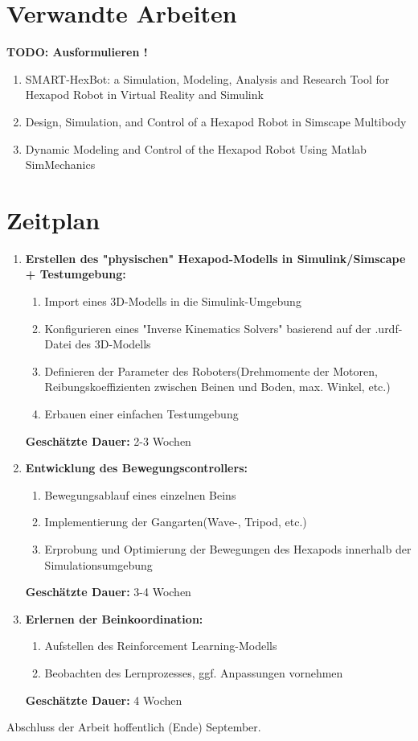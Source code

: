 \section{Verwandte Arbeiten}
\textbf{TODO: Ausformulieren !}
\begin{enumerate}

\item SMART-HexBot: a Simulation, Modeling, Analysis and
Research Tool for Hexapod Robot in Virtual Reality and
Simulink

\item Design, Simulation, and Control of a Hexapod Robot in
Simscape Multibody

\item Dynamic Modeling and Control of the Hexapod Robot Using Matlab SimMechanics

\end{enumerate}


\section{Zeitplan}
\begin{enumerate}
	\item \textbf{Erstellen des "physischen" Hexapod-Modells in Simulink/Simscape + Testumgebung:}
	\begin{enumerate}[label*=\arabic*.]
		\item Import eines 3D-Modells in die Simulink-Umgebung
		\item Konfigurieren eines "Inverse Kinematics Solvers" basierend auf der .urdf-Datei des 3D-Modells
		\item Definieren der Parameter des Roboters(Drehmomente der Motoren, Reibungskoeffizienten zwischen Beinen und Boden, max. Winkel, etc.)
		\item Erbauen einer einfachen Testumgebung
	\end{enumerate}
	\textbf{Geschätzte Dauer:} 2-3 Wochen
	
	\item \textbf{Entwicklung des Bewegungscontrollers:}
	\begin{enumerate}[label*=\arabic*.]
		\item Bewegungsablauf eines einzelnen Beins
		\item Implementierung der Gangarten(Wave-, Tripod, etc.)	
		\item Erprobung und Optimierung der Bewegungen des Hexapods innerhalb der Simulationsumgebung
	\end{enumerate}
	\textbf{Geschätzte Dauer:} 3-4 Wochen
	
	\item \textbf{Erlernen der Beinkoordination:}
	\begin{enumerate}[label*=\arabic*.]
		\item Aufstellen des Reinforcement Learning-Modells
		\item Beobachten des Lernprozesses, ggf. Anpassungen vornehmen
	\end{enumerate}
	\textbf{Geschätzte Dauer:} 4 Wochen
	

\end{enumerate}


Abschluss der Arbeit hoffentlich (Ende) September.